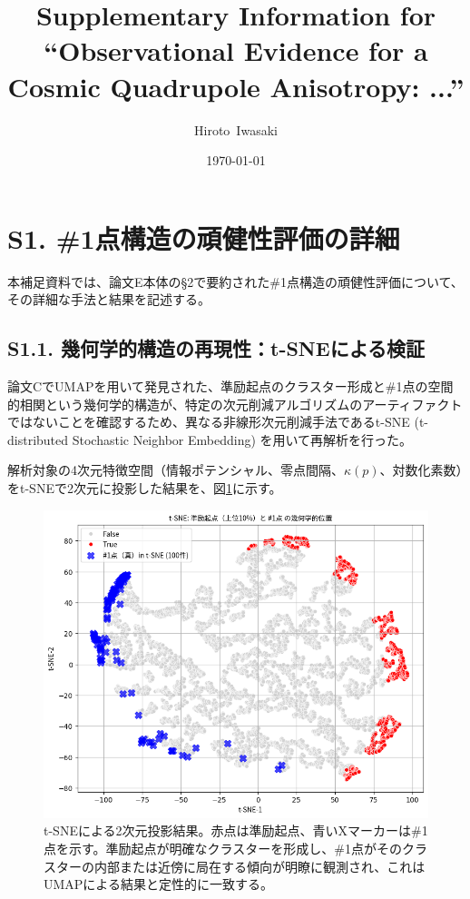 \documentclass[a4paper,12pt]{article}
\begin{document}
\title{Supplementary Information for \\ ``Observational Evidence for a Cosmic Quadrupole Anisotropy: ...''}
\author{Hiroto~Iwasaki}
\date{\today}
\maketitle

\section*{S1. \#1点構造の頑健性評価の詳細}
\label{sec:supp_robustness}

本補足資料では、論文E本体の§2で要約された\#1点構造の頑健性評価について、その詳細な手法と結果を記述する。

\subsection*{S1.1. 幾何学的構造の再現性：t-SNEによる検証}
\label{subsec:supp_geometry}

論文CでUMAPを用いて発見された、準励起点のクラスター形成と\#1点の空間的相関という幾何学的構造が、特定の次元削減アルゴリズムのアーティファクトではないことを確認するため、異なる非線形次元削減手法であるt-SNE (t-distributed Stochastic Neighbor Embedding) を用いて再解析を行った。

解析対象の4次元特徴空間（情報ポテンシャル、零点間隔、$\kappa(p)$、対数化素数）をt-SNEで2次元に投影した結果を、図\ref{fig:supp_tsne_projection}に示す。

\begin{figure}[H]
    \centering
    \includegraphics[width=0.8\linewidth]{S1_tsne_projection_robustness.png}
    \caption{t-SNEによる2次元投影結果。赤点は準励起点、青いXマーカーは\#1点を示す。準励起点が明確なクラスターを形成し、\#1点がそのクラスターの内部または近傍に局在する傾向が明瞭に観測され、これはUMAPによる結果と定性的に一致する。}
    \label{fig:supp_tsne_projection}
\end{figure}
\end{document}
